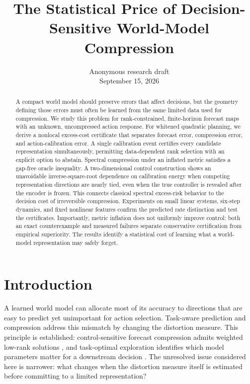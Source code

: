 \documentclass{article}
\title{The Statistical Price of Decision-Sensitive World-Model Compression}
\author{Anonymous research draft\\September 15, 2026}
\begin{document}
\maketitle
{}
\begin{abstract}
A compact world model should preserve errors that affect decisions, but the geometry defining those errors must often be learned from the same limited data used for compression. We study this problem for rank-constrained, finite-horizon forecast maps with an unknown, uncompressed action response. For whitened quadratic planning, we derive a nonlocal excess-cost certificate that separates forecast error, compression error, and action-calibration error. A single calibration event certifies every candidate representation simultaneously, permitting data-dependent rank selection with an explicit option to abstain. Spectral compression under an inflated metric satisfies a gap-free oracle inequality. A two-dimensional control construction shows an unavoidable inverse-square-root dependence on calibration energy when competing representation directions are nearly tied, even when the true controller is revealed after the encoder is frozen. This connects classical spectral excess-risk behavior to the decision cost of irreversible compression. Experiments on small linear systems, six-step dynamics, and fixed nonlinear features confirm the predicted rate distinction and test the certificates. Importantly, metric inflation does not uniformly improve control: both an exact counterexample and measured failures separate conservative certification from empirical superiority. The results identify a statistical cost of learning what a world-model representation may safely forget.
\end{abstract}

\section{Introduction}
A learned world model can allocate most of its accuracy to directions that are easy to predict yet unimportant for action selection. Task-aware prediction and compression address this mismatch by changing the distortion measure. This principle is established: control-sensitive forecast compression admits weighted low-rank solutions \citep{cheng2021}, and task-optimal exploration identifies which model parameters matter for a downstream decision \citep{wagenmaker2021}. The unresolved issue considered here is narrower: what changes when the distortion measure itself is estimated before committing to a limited representation?
\end{document}
